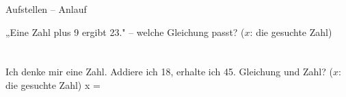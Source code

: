 \setcounter{aufgabe}{0}

\begin{aufgabe}{Aufstellen – Anlauf}
\begin{teile}
\teil „Eine Zahl plus 9 ergibt 23." – welche Gleichung passt? ($x$: die gesuchte Zahl) \\  \\  \\ 
\teil Ich denke mir eine Zahl. Addiere ich 18, erhalte ich 45. Gleichung und Zahl? ($x$: die gesuchte Zahl) x = \leerfeld
\end{teile}
\end{aufgabe}

